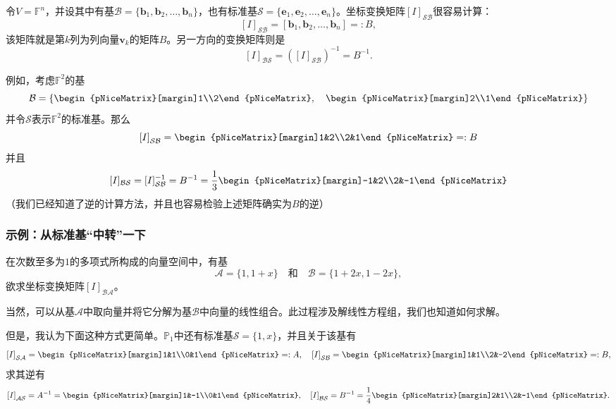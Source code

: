 令$V=\mathbb{F}^n$，并设其中有基$\mathcal{B}=\{\mathbf{b}_{1},\mathbf{b}_{2},\ldots,\mathbf{b}_{n}\}$，也有标准基$\mathcal{S}=\{\mathbf{e}_{1},\mathbf{e}_{2},\ldots,\mathbf{e}_{n}\}$。坐标变换矩阵$[I]_{\mathcal{SB}}$很容易计算：\[\left[I\right]_{\mathcal{SB}}=\left[\mathbf{b}_1,\mathbf{b}_2,\ldots,\mathbf{b}_n\right]=:B,\]
该矩阵就是第$k$列为列向量$\mathbf{v}_k$的矩阵$B$。另一方向的变换矩阵则是\[\left[I\right]_{\mathcal{BS}}=\left(\left[I\right]_{\mathcal{SB}}\right)^{-1}=B^{-1}.\]

例如，考虑$\mathbb{F}^2$的基\[\mathcal{B}=\left\{\begin{pNiceMatrix}[margin]1\\2\end{pNiceMatrix},\quad\begin{pNiceMatrix}[margin]2\\1\end{pNiceMatrix}\right\}\]
并令$\mathcal{S}$表示$\mathbb{F}^2$的标准基。那么\[\left[I\right]_{\mathcal{SB}}=\begin{pNiceMatrix}[margin]1&2\\2&1\end{pNiceMatrix}=:B\]并且\[[I]_{\mathcal{BS}}=[I]_{\mathcal{SB}}^{-1}=B^{-1}=\frac{1}{3}\begin{pNiceMatrix}[margin]-1&2\\2&-1\end{pNiceMatrix}\]
（我们已经知道了逆的计算方法，并且也容易检验上述矩阵确实为$B$的逆）

\subsubsection{示例：从标准基“中转”一下}

在次数至多为$1$的多项式所构成的向量空间中，有基\[\mathcal{A}=\{1,1+x\}\quad\text{和}\quad\mathcal{B}=\{1+2x,1-2x\},\]
欲求坐标变换矩阵$[I]_\mathcal{BA}$。

当然，可以从基$\mathcal{A}$中取向量并将它分解为基$\mathcal{B}$中向量的线性组合。此过程涉及解线性方程组，我们也知道如何求解。

但是，我认为下面这种方式更简单。$\mathbb{P}_1$中还有标准基$\mathcal{S} =\{1,x\}$，并且关于该基有\[\left[I\right]_{\mathcal{SA}}=\begin{pNiceMatrix}[margin]1&1\\0&1\end{pNiceMatrix}=:A,\quad\left[I\right]_{\mathcal{SB}}=\begin{pNiceMatrix}[margin]1&1\\2&-2\end{pNiceMatrix}=:B,\]
求其逆有\[\left[I\right]_{\mathcal{AS}}=A^{-1}=\begin{pNiceMatrix}[margin]1&-1\\0&1\end{pNiceMatrix},\quad\left[I\right]_{\mathcal{BS}}=B^{-1}=\frac{1}{4}\begin{pNiceMatrix}[margin]2&1\\2&-1\end{pNiceMatrix}.\]

